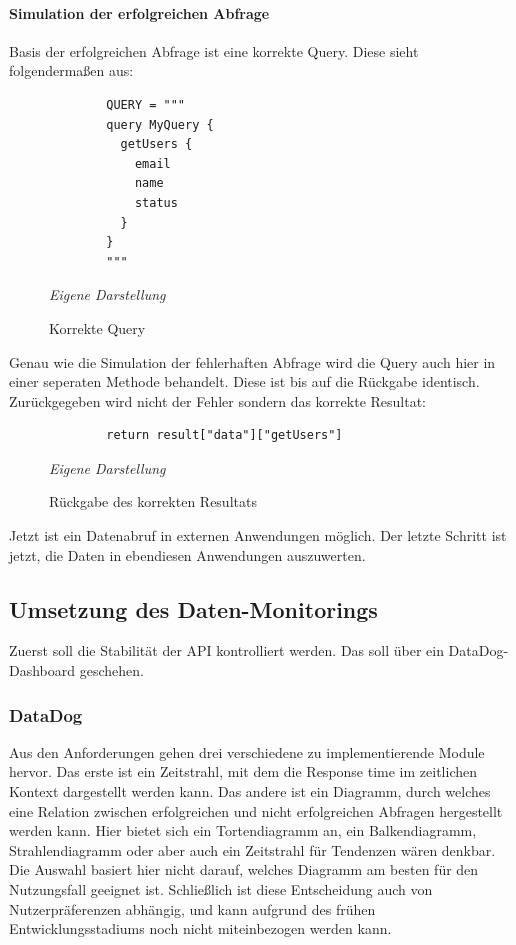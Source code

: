 	\paragraph{Simulation der erfolgreichen Abfrage}
	Basis der erfolgreichen Abfrage ist eine korrekte Query. Diese sieht folgendermaßen aus:\newline
		\begin{figure}[H]
		\centering
		\begin{minipage}[t]{.7\textwidth} %
		\caption{Korrekte Query} %
		\begin{verbatim}
		QUERY = """
		query MyQuery {
		  getUsers {
		    email
		    name
		    status
		  }
		}
		"""
		\end{verbatim}
		
		\textit{Eigene Darstellung} %
		\label{fig:korrekteQuery}
		\end{minipage}
		\end{figure}
	Genau wie die Simulation der fehlerhaften Abfrage wird die Query auch hier in einer seperaten Methode behandelt. Diese ist bis auf die Rückgabe identisch. Zurückgegeben wird nicht der Fehler sondern das korrekte Resultat:\newline
		\begin{figure}[H]
		\centering
		\begin{minipage}[t]{.7\textwidth} %
		\caption{Rückgabe des korrekten Resultats} %
		\begin{verbatim}
		return result["data"]["getUsers"]
		\end{verbatim}
		
		\textit{Eigene Darstellung} %
		\label{fig:resultatsRückgabe}
		\end{minipage}
		\end{figure}
Jetzt ist ein Datenabruf in externen Anwendungen möglich. Der letzte Schritt ist jetzt, die Daten in ebendiesen Anwendungen auszuwerten.
\subsection{Umsetzung des Daten-Monitorings}
Zuerst soll die Stabilität der API kontrolliert werden. Das soll über ein DataDog-Dashboard geschehen.
\subsubsection{DataDog}
Aus den Anforderungen gehen drei verschiedene zu implementierende Module hervor. Das erste ist ein Zeitstrahl, mit dem die Response time im zeitlichen Kontext dargestellt werden kann.  Das andere ist ein Diagramm, durch welches eine Relation zwischen erfolgreichen und nicht erfolgreichen Abfragen hergestellt werden kann. Hier bietet sich ein Tortendiagramm an, ein Balkendiagramm, Strahlendiagramm oder aber auch ein Zeitstrahl für Tendenzen wären denkbar. Die Auswahl basiert hier nicht darauf, welches Diagramm am besten für den Nutzungsfall geeignet ist. Schließlich ist diese Entscheidung auch von Nutzerpräferenzen abhängig, und kann aufgrund des frühen Entwicklungsstadiums noch nicht miteinbezogen werden kann.
